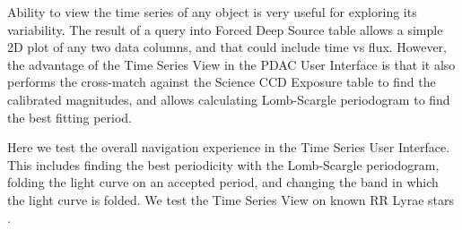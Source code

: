 \documentclass[DM,lsstdraft,toc]{lsstdoc}
\begin{document}
Ability to view the time series of any object is very useful for exploring its variability. The result of a query into Forced Deep Source table allows a simple 2D plot of any two data columns, and that could include time vs flux. However,  the advantage of the Time Series View in the PDAC User Interface is that it also performs the cross-match against the Science CCD Exposure table to find the calibrated magnitudes, and allows calculating Lomb-Scargle periodogram to find the best fitting period.

Here we test the overall navigation experience in the Time Series User Interface. This includes finding the best periodicity with the Lomb-Scargle periodogram, folding the light curve on an accepted period, and changing the band in which the light curve is folded. We test the Time Series View on known RR Lyrae stars \citep{2010ApJ...708..717S}.
\end{document}

